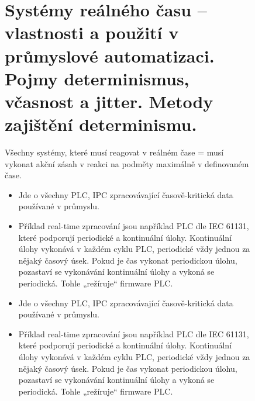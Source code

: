 \begin{figure}[h]
\section{Systémy reálného času – vlastnosti a použití v průmyslové automatizaci. Pojmy determinismus, včasnost a jitter. Metody zajištění determinismu.}
Všechny systémy, které musí reagovat v reálném čase = musí vykonat akční zásah v reakci na podměty maximálně v definovaném čase.
\begin{itemize}
  \item Jde o všechny PLC, IPC zpracovávající časově-kritická data používané v průmyslu.
  \item Příklad real-time zpracování jsou například PLC dle IEC 61131, které podporují periodické a kontinuální úlohy. Kontinuální úlohy vykonává v každém cyklu PLC, periodické vždy jednou za nějaký časový úsek. Pokud je čas vykonat periodickou úlohu, pozastaví se vykonávání kontinuální úlohy a vykoná se periodická. Tohle „režíruje“ firmware PLC.
    \item Jde o všechny PLC, IPC zpracovávající časově-kritická data používané v průmyslu.
    \item Příklad real-time zpracování jsou například PLC dle IEC 61131, které podporují periodické a kontinuální úlohy. Kontinuální úlohy vykonává v každém cyklu PLC, periodické vždy jednou za nějaký časový úsek. Pokud je čas vykonat periodickou úlohu, pozastaví se vykonávání kontinuální úlohy a vykoná se periodická. Tohle „režíruje“ firmware PLC.
\end{itemize}


\end{figure}
